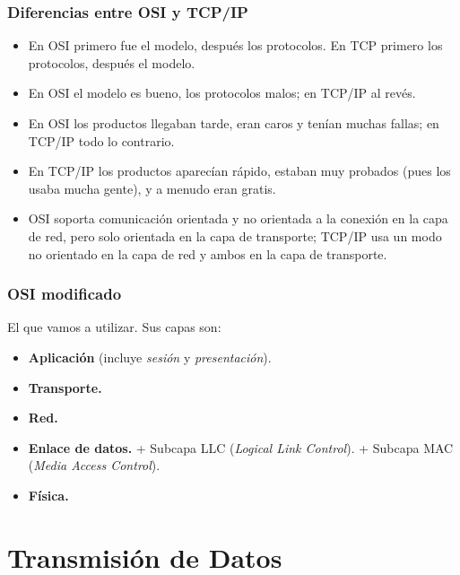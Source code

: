 \documentclass[10pt,a4paper]{article}
\begin{document}
\subsubsection{Diferencias entre OSI y TCP/IP}
\begin{itemize}
\item En OSI primero fue el modelo, después los protocolos. En TCP primero los protocolos, después el modelo.
\item En OSI el modelo es bueno, los protocolos malos; en TCP/IP al revés.
\item En OSI los productos llegaban tarde, eran caros y tenían muchas fallas; en TCP/IP todo lo contrario.
\item En TCP/IP los productos aparecían rápido, estaban muy probados (pues los usaba mucha gente), y a menudo eran gratis.
\item OSI soporta comunicación orientada y no orientada a la conexión en la capa de red, pero solo orientada en la capa de transporte; TCP/IP usa un modo no orientado en la capa de red y ambos en la capa de transporte.
\end{itemize}

\subsubsection{OSI modificado}
El que vamos a utilizar. Sus capas son:
\begin{itemize}
\item \textbf{Aplicación} (incluye \textit{sesión} y \textit{presentación}).
\item \textbf{Transporte.}
\item \textbf{Red.}
\item \textbf{Enlace de datos.}
\subitem + Subcapa LLC (\textit{Logical Link Control}).
\subitem + Subcapa MAC (\textit{Media Access Control}).
\item \textbf{Física.}
\end{itemize}

\section{Transmisión de Datos}
\end{document}
